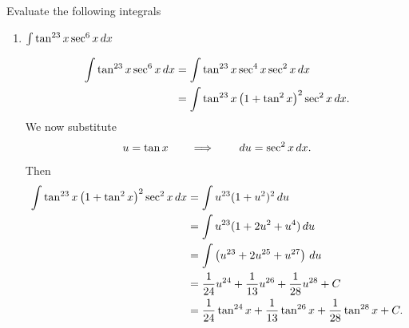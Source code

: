 \documentclass[noinstructornotes]{ximera}
\begin{document}
\begin{problem}
Evaluate the following integrals
	\begin{enumerate}
	
	\item  $\int \tan^{23} x \sec^6 x \,d x$
	\begin{freeResponse}
		\begin{align*}
		\int \tan^{23} x \sec^6 x \,d x 
		&= \int \tan^{23} x \sec^4 x \sec^2 x \,d x  \\
		&= \int \tan^{23} x \left( 1 + \tan^2 x \right)^2 \sec^2 x \,d x .
		\end{align*}
	We now substitute
		{\color{red}
		\[
		u = \tan x 	\qquad	\Longrightarrow		\qquad	\,d u = \sec^2 x \,d x.
		\]
		}
	Then
		\begin{align*}
		\int \tan^{23} x \left( 1 + \tan^2 x \right)^2 \sec^2 x \,d x
		&= \int u^{23} (1+u^2)^2 \,d u  \\
		&= \int u^{23} (1 + 2u^2 + u^4) \,d u  \\
		&= \int \left( u^{23} + 2u^{25} + u^{27} \right) \,d u  \\
		&= \frac{1}{24} u^{24} + \frac{1}{13} u^{26} + \frac{1}{28} u^{28} + C  \\
		&= \frac{1}{24} \tan^{24} x + \frac{1}{13} \tan^{26} x + \frac{1}{28} \tan^{28} x + C.
		\end{align*}
	\end{freeResponse}
	
	
	

\end{enumerate}
\end{problem}
\end{document}
